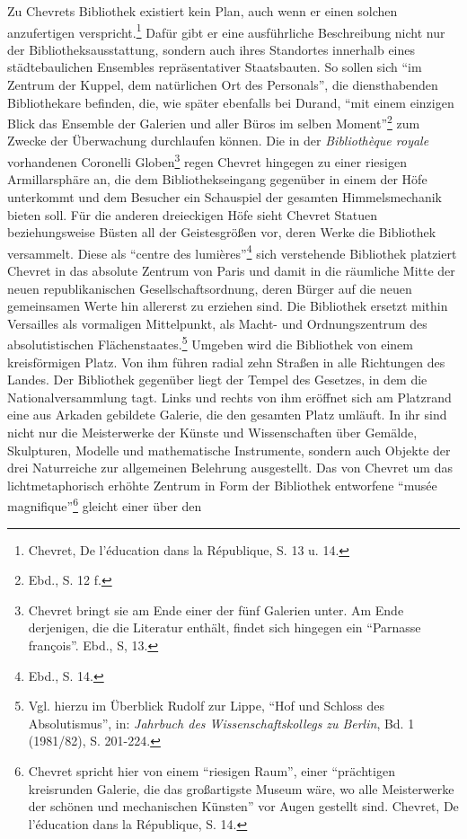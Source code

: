 Zu Chevrets Bibliothek existiert kein Plan, auch wenn er einen solchen
anzufertigen verspricht.\footnote{Chevret, De l'éducation dans la
  République, S. 13 u. 14.} Dafür gibt er eine ausführliche Beschreibung
nicht nur der Bibliotheksausstattung, sondern auch ihres Standortes
innerhalb eines städtebaulichen Ensembles repräsentativer Staatsbauten.
So sollen sich \enquote{im Zentrum der Kuppel, dem natürlichen Ort des
Personals}, die diensthabenden Bibliothekare befinden, die, wie später
ebenfalls bei Durand, \enquote{mit einem einzigen Blick das Ensemble der
Galerien und aller Büros im selben Moment}\footnote{Ebd., S. 12 f.} zum
Zwecke der Überwachung durchlaufen können. Die in der \emph{Bibliothèque
royale} vorhandenen Coronelli Globen\footnote{Chevret bringt sie am Ende
  einer der fünf Galerien unter. Am Ende derjenigen, die die Literatur
  enthält, findet sich hingegen ein \enquote{Parnasse françois}. Ebd.,
  S, 13.} regen Chevret hingegen zu einer riesigen Armillarsphäre an,
die dem Bibliothekseingang gegenüber in einem der Höfe unterkommt und
dem Besucher ein Schauspiel der gesamten Himmelsmechanik bieten soll.
Für die anderen dreieckigen Höfe sieht Chevret Statuen beziehungsweise
Büsten all der Geistesgrößen vor, deren Werke die Bibliothek versammelt.
Diese als \enquote{centre des lumières}\footnote{Ebd., S. 14.} sich
verstehende Bibliothek platziert Chevret in das absolute Zentrum von
Paris und damit in die räumliche Mitte der neuen republikanischen
Gesellschaftsordnung, deren Bürger auf die neuen gemeinsamen Werte hin
allererst zu erziehen sind. Die Bibliothek ersetzt mithin Versailles als
vormaligen Mittelpunkt, als Macht- und Ordnungszentrum des
absolutistischen Flächenstaates.\footnote{Vgl. hierzu im Überblick
  Rudolf zur Lippe, \enquote{Hof und Schloss des Absolutismus}, in:
  \emph{Jahrbuch des Wissenschaftskollegs} \emph{zu Berlin}, Bd. 1
  (1981/82), S. 201-224.} Umgeben wird die Bibliothek von einem
kreisförmigen Platz. Von ihm führen radial zehn Straßen in alle
Richtungen des Landes. Der Bibliothek gegenüber liegt der Tempel des
Gesetzes, in dem die Nationalversammlung tagt. Links und rechts von ihm
eröffnet sich am Platzrand eine aus Arkaden gebildete Galerie, die den
gesamten Platz umläuft. In ihr sind nicht nur die Meisterwerke der
Künste und Wissenschaften über Gemälde, Skulpturen, Modelle und
mathematische Instrumente, sondern auch Objekte der drei Naturreiche zur
allgemeinen Belehrung ausgestellt. Das von Chevret um das
lichtmetaphorisch erhöhte Zentrum in Form der Bibliothek entworfene
\enquote{musée magnifique}\footnote{Chevret spricht hier von einem
  \enquote{riesigen Raum}, einer \enquote{prächtigen kreisrunden
  Galerie, die das großartigste Museum wäre, wo alle Meisterwerke der
  schönen und mechanischen Künsten} vor Augen gestellt sind. Chevret, De
  l'éducation dans la République, S. 14.} gleicht einer über den
